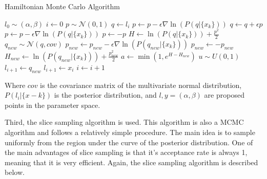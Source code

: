 \documentclass[12pt]{report} %
\begin{document}
\vspace*{1\baselineskip}
\begin{definitionbox}{Hamiltonian Monte Carlo Algorithm}
    \begin{algorithmic}[1]
        \State $l_{0} \sim (\alpha, \beta)$ 
        \State $i \gets 0$
         
            \State $p \sim \mathcal{N}(0, 1)$ 
            \State $q \gets l_{i}$ 
            \State $p \gets p - \epsilon \nabla \ln(P(q|\{x_{k}\}))$ 
            \State $q \gets q + \epsilon p$ 
            \State $p \gets p - \epsilon \nabla \ln(P(q|\{x_{k}\}))$ 
            \State $p \gets -p$ 
            \State $H \gets \ln(P(q|\{x_{k}\})) + \frac{p^{2}}{2}$ 
            \State $q_{new} \sim \mathcal{N}(q, cov)$ 
            \State $p_{new} \gets p_{new} - \epsilon \nabla \ln(P(q_{new}|\{x_{k}\}))$ 
            \State $p_{new} \gets -p_{new}$ 
            \State $H_{new} \gets \ln(P(q_{new}|\{x_{k}\})) + \frac{p_{new}^{2}}{2}$ 
            \State $a \gets \min(1, e^{H - H_{new}})$ 
            \State $u \sim U(0, 1)$ 
                \State $l_{i+1} \gets q_{new}$ 
            \Else
                \State $l_{i+1} \gets x_{
                i}$ 
            \EndIf
            \State $i \gets i + 1$
        \EndWhile
        \end{algorithmic}
    Where $cov$ is the covariance matrix of the multivariate normal distribution, $P(l_{i}|\{x-{k}\})$ is the posterior distribution, and $l, y = (\alpha, \beta)$ are proposed points in the parameter space.
\end{definitionbox}


Third, the slice sampling algorithm is used. This algorithm is also a MCMC algorithm and follows a relatively simple procedure. The main idea is to sample uniformly from the region under the curve of the posterior distribution. One of the main advantages of slice sampling is that it's acceptance rate is always 1, meaning that it is very efficient. Again, the slice sampling algorithm is described below.
\end{document}
